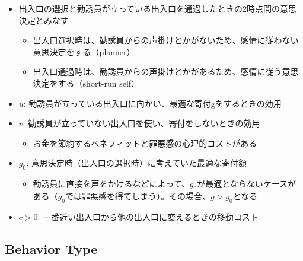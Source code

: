 \documentclass[../root]{subfiles}
\begin{document}
    \begin{itemize}
        \item 出入口の選択と勧誘員が立っている出入口を通過したときの2時点間の意思決定とみなす
        \begin{itemize}
            \item 出入口選択時は、勧誘員からの声掛けとかがないため、感情に従わない意思決定をする（planner）
            \item 出入口通過時は、勧誘員からの声掛けとかがあるため、感情に従う意思決定をする（short-run self）
        \end{itemize}
        \item $u$: 勧誘員が立っている出入口に向かい、最適な寄付gをするときの効用
        \item $v$: 勧誘員が立っていない出入口を使い、寄付をしないときの効用
        \begin{itemize}
            \item お金を節約するベネフィットと罪悪感の心理的コストがある
        \end{itemize}
        \item $g_0$: 意思決定時（出入口の選択時）に考えていた最適な寄付額
        \begin{itemize}
            \item 勧誘員に直接を声をかけるなどによって、$g_0$が最適とならないケースがある（$g_0$では罪悪感を得てしまう）。その場合、$g > g_0$となる
        \end{itemize}
        \item $c>0$: 一番近い出入口から他の出入口に変えるときの移動コスト
    \end{itemize}

    \subsection{Behavior Type}
\end{document}
